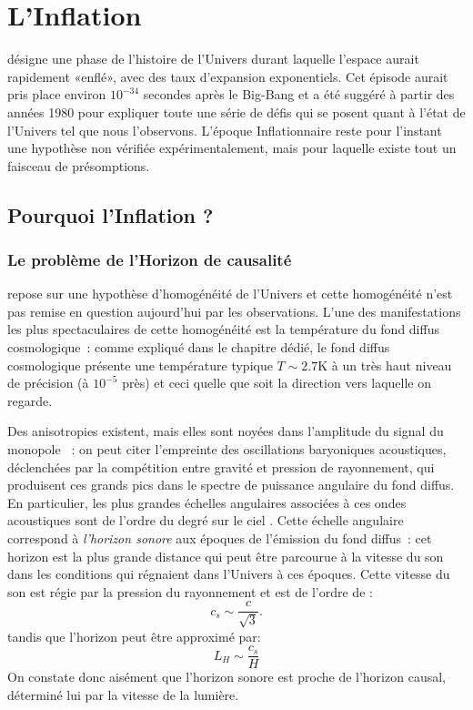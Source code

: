 \chapter{L'Inflation}
 désigne une phase de l'histoire de l'Univers durant laquelle l'espace aurait rapidement «enflé», avec des taux d'expansion exponentiels. Cet épisode aurait pris place environ $10^{-34}$ secondes après le Big-Bang et a été suggéré à partir des années 1980 pour expliquer toute une série de défis qui se posent quant à l'état de l'Univers tel que nous l'observons. L'époque Inflationnaire reste pour l'instant une hypothèse non vérifiée expérimentalement, mais pour laquelle existe tout un faisceau de présomptions.

\section{Pourquoi l'Inflation ?}
\subsection{Le problème de l'Horizon de causalité}
 repose sur une hypothèse d'homogénéité de l'Univers et cette homogénéité n'est pas remise en question aujourd'hui par les observations. L'une des manifestations les plus spectaculaires de cette homogénéité est la température du fond diffus cosmologique~: comme expliqué dans le chapitre dédié, le fond diffus cosmologique présente une température typique $T\sim 2.7 $K à un très haut niveau de précision (à $10^{-5}$ près) et ceci quelle que soit la direction vers laquelle on regarde. 

Des anisotropies existent, mais elles sont noyées dans l'amplitude du signal du monopole~ : on peut citer l'empreinte des oscillations baryoniques acoustiques, déclenchées par la compétition entre gravité et pression de rayonnement, qui produisent ces grands pics dans le spectre de puissance angulaire du fond diffus. En particulier, les plus grandes échelles angulaires associées à ces ondes acoustiques  sont de l'ordre du degré sur le ciel . Cette échelle angulaire correspond à \textit{l'horizon sonore} aux époques de l'émission du fond diffus~: cet horizon est la plus grande distance qui peut être parcourue à la vitesse du son dans les conditions qui régnaient dans l'Univers à ces époques. Cette vitesse du son est régie par la pression du rayonnement et est de l'ordre de :
\begin{equation}
c_s\sim \frac{c}{\sqrt 3}.
\end{equation}
tandis que l'horizon peut être approximé par:
\begin{equation}
L_H\sim\frac{c_s}{H}
\end{equation}
On constate donc aisément que l'horizon sonore est proche de l'horizon causal, déterminé lui par la vitesse de la lumière.

